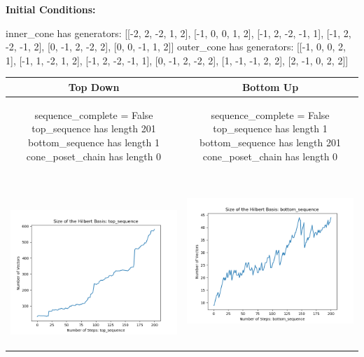 \documentclass[10pt]{article}
\begin{document}
\textbf{Initial Conditions:}
\begin{SAGE}
inner_cone has generators: 
[[-2, 2, -2, 1, 2], [-1, 0, 0, 1, 2], [-1, 2, -2, -1, 1], [-1, 2, -2, -1, 2], [0, -1, 2, -2, 2], [0, 0, -1, 1, 2]]
outer_cone has generators: 
[[-1, 0, 0, 2, 1], [-1, 1, -2, 1, 2], [-1, 2, -2, -1, 1], [0, -1, 2, -2, 2], [1, -1, -1, 2, 2], [2, -1, 0, 2, 2]]

\end{SAGE}
\begin{tabular}{c|c}
\textbf{Top Down} & \textbf{Bottom Up} \\ \hline  
\begin{SAGE}
	sequence_complete = False
	top_sequence has length 201
	bottom_sequence has length 1
	cone_poset_chain has length 0
\end{SAGE} 
&
\begin{SAGE}
	sequence_complete = False
	top_sequence has length 1
	bottom_sequence has length 201
	cone_poset_chain has length 0
\end{SAGE} 
\\ \hline
\
\begin{minipage}{.45\textwidth}
\includegraphics[width=\textwidth]{"DATA/5d/6 generators 2 bound G/top_sequence SIZE"}
\end{minipage} &
\begin{minipage}{.45\textwidth}
\includegraphics[width=\textwidth]{"DATA/5d/6 generators 2 bound G bottomup/bottom_sequence SIZE"}

\end{minipage}
\end{tabular}
\end{document}
